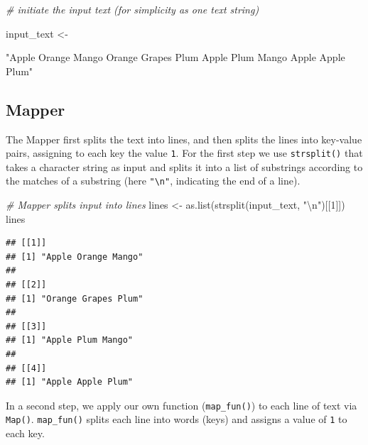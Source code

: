 \documentclass[
  12pt,
]{style/krantz}
\newenvironment{Shaded}{\begin{snugshade}}{\end{snugshade}}
\newcommand{\CommentTok}[1]{\textcolor[rgb]{0.56,0.35,0.01}{\textit{#1}}}
\newcommand{\DecValTok}[1]{\textcolor[rgb]{0.00,0.00,0.81}{#1}}
\newcommand{\FunctionTok}[1]{\textcolor[rgb]{0.00,0.00,0.00}{#1}}
\newcommand{\NormalTok}[1]{#1}
\newcommand{\OtherTok}[1]{\textcolor[rgb]{0.56,0.35,0.01}{#1}}
\newcommand{\SpecialCharTok}[1]{\textcolor[rgb]{0.00,0.00,0.00}{#1}}
\newcommand{\StringTok}[1]{\textcolor[rgb]{0.31,0.60,0.02}{#1}}
\begin{document}
\begin{Shaded}
\begin{Highlighting}[]
\CommentTok{\# initiate the input text (for simplicity as one text string)}

\NormalTok{input\_text }\OtherTok{\textless{}{-}}

\StringTok{"Apple Orange Mango}
\StringTok{Orange Grapes Plum}
\StringTok{Apple Plum Mango}
\StringTok{Apple Apple Plum"}
\end{Highlighting}
\end{Shaded}

\hypertarget{mapper}{%
\subsection{Mapper}\label{mapper}}

The Mapper first splits the text into lines, and then splits the lines into key-value pairs, assigning to each key the value \texttt{1}. For the first step we use \texttt{strsplit()} that takes a character string as input and splits it into a list of substrings according to the matches of a substring (here \texttt{"\textbackslash{}n"}, indicating the end of a line).

\begin{Shaded}
\begin{Highlighting}[]
\CommentTok{\# Mapper splits input into lines}
\NormalTok{lines }\OtherTok{\textless{}{-}} \FunctionTok{as.list}\NormalTok{(}\FunctionTok{strsplit}\NormalTok{(input\_text, }\StringTok{"}\SpecialCharTok{\textbackslash{}n}\StringTok{"}\NormalTok{)[[}\DecValTok{1}\NormalTok{]])}
\NormalTok{lines}
\end{Highlighting}
\end{Shaded}

\begin{verbatim}
## [[1]]
## [1] "Apple Orange Mango"
## 
## [[2]]
## [1] "Orange Grapes Plum"
## 
## [[3]]
## [1] "Apple Plum Mango"
## 
## [[4]]
## [1] "Apple Apple Plum"
\end{verbatim}

In a second step, we apply our own function (\texttt{map\_fun()}) to each line of text via \texttt{Map()}. \texttt{map\_fun()} splits each line into words (keys) and assigns a value of \texttt{1} to each key.
\end{document}
